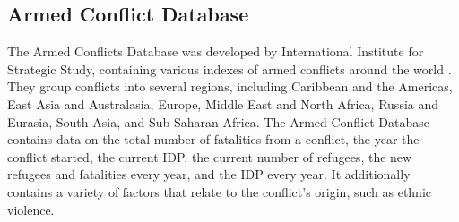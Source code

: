 \subsection{Armed Conflict Database}
The Armed Conflicts Database was developed by International Institute for Strategic Study, containing various indexes of armed conflicts around the world \cite{conflictDB}. They group conflicts into several regions, including Caribbean and the Americas, East Asia and Australasia, Europe, Middle East and North Africa, Russia and Eurasia, South Asia, and Sub-Saharan Africa. The Armed Conflict Database contains data on the total number of fatalities from a conflict, the year the conflict started, the current IDP, the current number of refugees, the new refugees and fatalities every year, and the IDP every year. It additionally contains a variety of factors that relate to the conflict's origin, such as ethnic violence. 




